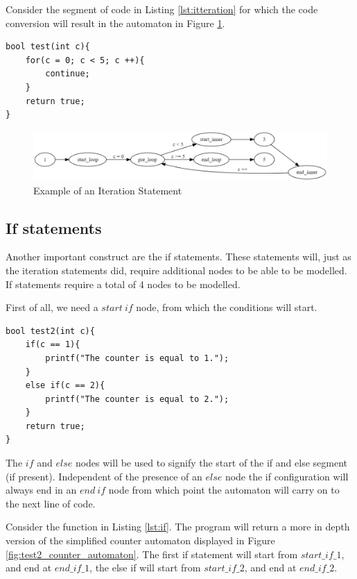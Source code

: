 \documentclass[12pt]{thesis}
\begin{document}
Consider the segment of code in Listing \ref{lst:itteration} for which the code conversion will result in the automaton in Figure \ref{fig:test_counter_automaton}.

\begin{lstlisting}[style=CStyle, caption={Example of an itteration statement}, label={lst:itteration}]
bool test(int c){
	for(c = 0; c < 5; c ++){
		continue;
	}
	return true;
}
\end{lstlisting}

\begin{figure}[h]
	\centering
	\includegraphics[width=0.95\linewidth]{test_counter_automaton}
	\caption{Example of an Iteration Statement}
	\label{fig:test_counter_automaton}
\end{figure}

\subsection{If statements}
\label{sec:if}
Another important construct are the if statements. These statements will, just as the iteration statements did, require additional nodes to be able to be modelled. If statements require a total of 4 nodes to be modelled.

First of all, we need a $start\ if$ node, from which the conditions will start. 

\begin{lstlisting}[style=CStyle, caption={Example if statements}, label={lst:if}]
bool test2(int c){
	if(c == 1){
		printf("The counter is equal to 1.");
	}
	else if(c == 2){
		printf("The counter is equal to 2.");
	}
	return true;
}
\end{lstlisting}

\noindent
The $if$ and $else$ nodes will be used to signify the start of the if and else segment (if present). Independent of the presence of an $else$ node the if configuration will always end in an $end\ if$ node from which point the automaton will carry on to the next line of code.

Consider the function in Listing \ref{lst:if}. The program will return a more in depth version of the simplified counter automaton displayed in Figure \ref{fig:test2_counter_automaton}. The first if statement will start from $start\_if\_1$, and end at $end\_if\_1$, the else if will start from $start\_if\_2$, and end at $end\_if\_2$.
\end{document}
